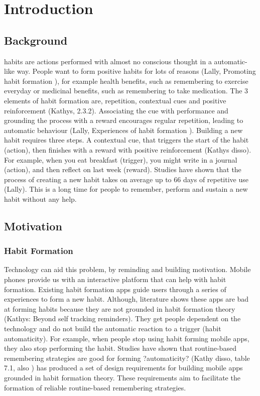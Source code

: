 
\section{Introduction}

\subsection*{Background}
habits are actions performed with almost no conscious thought in a automatic-like way. People want to form positive habits for lots of reasons (Lally, Promoting habit formation \cite{article_promoting_habit_formation}), for example health benefits, such as remembering to exercise everyday or medicinal benefits, such as remembering to take medication. The 3 elements of habit formation are, repetition, contextual cues and positive reinforcement (Kathys, 2.3.2). Associating the cue with performance and grounding the process with a reward encourages regular repetition, leading to automatic behaviour (Lally, Experiences of habit formation \cite{article_experiences_of_habit_formation}). Building a new habit requires three steps. A contextual cue, that triggers the start of the habit (action), then finishes with a reward with positive reinforcement (Kathys disso). For example, when you eat breakfast (trigger), you might write in a journal (action), and then reflect on last week (reward). Studies have shown that the process of creating a new habit takes on average up to 66 days of repetitive use (Lally). This is a long time for people to remember, perform and sustain a new habit without any help.

\subsection*{Motivation}

\subsubsection*{Habit Formation}
Technology can aid this problem, by reminding and building motivation. Mobile phones provide us with an interactive platform that can help with habit formation. Existing habit formation apps guide users through a series of experiences to form a new habit. Although, literature shows these apps are bad at forming habits because they are not grounded in habit formation theory (Kathys: Beyond self tracking reminders). They get people dependent on the technology and do not build the automatic reaction to a trigger (habit automaticity). For example, when people stop using habit forming mobile apps, they also stop performing the habit.\newline
\newline
Studies have shown that routine-based remembering strategies are good for forming ?automaticity? (Kathy disso, table 7.1, also \cite{article_dont_forget_your_pill}) has produced a set of design requirements for building mobile apps grounded in habit formation theory. These requirements aim to facilitate the formation of reliable routine-based remembering strategies.

